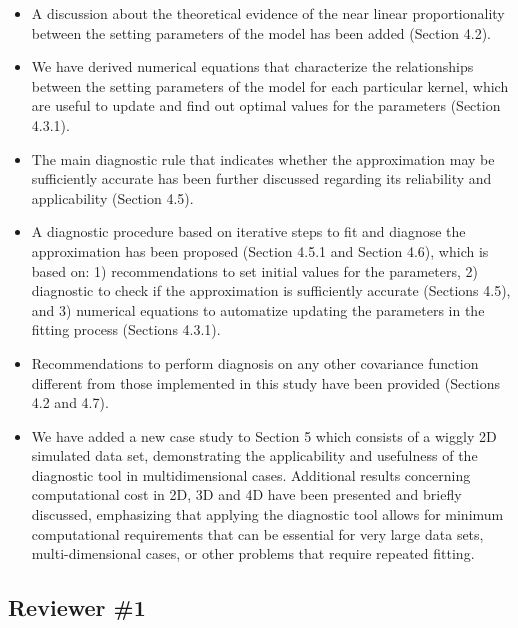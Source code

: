 \documentclass[11pt]{report}
\begin{document}
\begin{itemize}

\item A discussion about the theoretical evidence of the near linear proportionality between the setting parameters of the model has been added (Section 4.2). 

\item We have derived numerical equations that characterize the relationships between the setting parameters of the model for each particular kernel, which are useful to update and find out optimal values for the parameters (Section 4.3.1). 

\item The main diagnostic rule that indicates whether the approximation may be sufficiently accurate has been further discussed regarding its reliability and applicability (Section 4.5).

\item A diagnostic procedure based on iterative steps to fit and diagnose the approximation has been proposed (Section 4.5.1 and Section 4.6), which is based on: 1) recommendations to set initial values for the parameters, 2) diagnostic to check if the approximation is sufficiently accurate (Sections 4.5), and 3) numerical equations to automatize updating the parameters in the fitting process (Sections 4.3.1).

\item Recommendations to perform diagnosis on any other covariance function different from those implemented in this study have been provided (Sections 4.2 and 4.7).

\item We have added a new case study to Section 5 which consists of a wiggly 2D simulated data set, demonstrating the applicability and usefulness of the diagnostic tool in multidimensional cases. Additional results concerning computational cost in 2D, 3D and 4D have been presented and briefly discussed, emphasizing that applying the diagnostic tool allows for minimum computational requirements that can be essential for very large data sets, multi-dimensional cases, or other problems that require repeated fitting.

\end{itemize}

\noindent \hdashrule{12.5cm}{0.2pt}{2mm 1pt}

\subsection*{Reviewer \#1}
\end{document}
